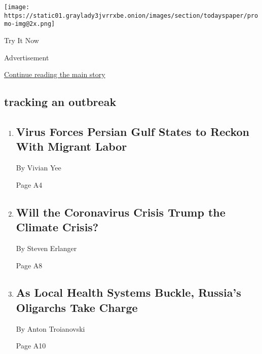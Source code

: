 \texttt{[image: https://static01.graylady3jvrrxbe.onion/images/section/todayspaper/promo-img@2x.png]}

Try It Now

Advertisement

\protect\hyperlink{after-mid1}{Continue reading the main story}

\hypertarget{tracking-an-outbreak}{%
\subsection{tracking an outbreak}\label{tracking-an-outbreak}}

\begin{enumerate}
\def\labelenumi{\arabic{enumi}.}
\item
  \href{/2020/05/09/world/middleeast/virus-forces-persian-gulf-states-to-reckon-with-migrant-labor.html}{}

  \hypertarget{virus-forces-persian-gulf-states-to-reckon-with-migrant-labor}{%
  \subsection{Virus Forces Persian Gulf States to Reckon With Migrant
  Labor}\label{virus-forces-persian-gulf-states-to-reckon-with-migrant-labor}}

  By Vivian Yee

  Page A4
\item
  \href{/2020/05/09/world/europe/will-the-coronavirus-crisis-trump-the-climate-crisis.html}{}

  \hypertarget{will-the-coronavirus-crisis-trump-the-climate-crisis}{%
  \subsection{Will the Coronavirus Crisis Trump the Climate
  Crisis?}\label{will-the-coronavirus-crisis-trump-the-climate-crisis}}

  By Steven Erlanger

  Page A8
\item
  \href{/2020/05/07/world/europe/oligarchs-russia-coronavirus.html}{}

  \hypertarget{as-local-health-systems-buckle-russias-oligarchs-take-charge}{%
  \subsection{As Local Health Systems Buckle, Russia's Oligarchs Take
  Charge}\label{as-local-health-systems-buckle-russias-oligarchs-take-charge}}

  By Anton Troianovski

  Page A10
\end{enumerate}

